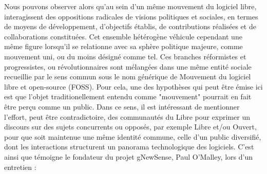 Nous pouvons observer alors qu'au sein d'un même mouvement du logiciel libre, interagissent des oppositions radicales de visions politiques et sociales, en termes de moyens de développement, d'objectifs établis, de contributions réalisées et de collaborations constituées. Cet ensemble hétérogène véhicule cependant  une même figure lorsqu'il se relationne avec sa sphère politique majeure, comme mouvement uni, ou du moins désigné comme tel. Ces branches réformistes et progressistes, ou révolutionnaires sont mélangées dans une même entité sociale recueillie par le sens commun sous le nom générique de Mouvement du logiciel libre et open-source (FOSS). Pour cela, une des hypothèses qui peut être émise ici est que l'objet traditionellement entendu comme "mouvement" pourrait en fait être perçu comme un public. Dans ce sens, il est intéressant de mentionner l'effort, peut être contradictoire, des communautés du Libre pour exprimer un discours sur des sujets concurrents ou opposés, par exemple Libre et/ou Ouvert, pour que soit maintenue une même identité commune, celle d'un public diversifié, dont les interactions structurent un panorama technologique des logiciels. C'est ainsi que témoigne le fondateur du projet gNewSense, Paul O'Malley, lors d'un entretien :


